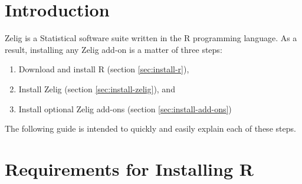 \tableofcontents
\newcommand{\InstallInteractive}[0]{
  \href{http://r.iq.harvard.edu/install_live.R}{http://r.iq.harvard.edu/install_live.R}
}

\newcommand{\CranMirror}[0]{
  \href{http://cran.opensourceresources.org/}{http://cran.opensourceresources.org/}
}

\newcommand{\InstallInstructionsHref}[0]{
  \href{http://cran.r-project.org/doc/manuals/R-admin.html}{http://cran.r-project.org/doc/manuals/R-admin.html}
}


\newcommand{\MacInstallHref}[0]{
\href{http://cran.r-project.org/doc/manuals/R-admin.html\#Installing-R-under-_0028Mac_0029-OS-X}{Mac}
}

\newcommand{\WindowsInstallHref}[0]{
\href{http://cran.r-project.org/doc/manuals/R-admin.html\#Installing-R-under-Windows}{Windows}
}

\newcommand{\UnixInstallHref}[0]{
\href{http://cran.r-project.org/doc/manuals/R-admin.html\#Installing-R-under-Unix_002dalikes}{Unix-alike}
}


\section{Introduction}

Zelig is a Statistical software suite written in the R programming language.
As a result, installing any Zelig add-on is a matter of three steps:

\begin{enumerate}
  \item Download and install R (section \ref{sec:install-r}),
  \item Install Zelig (section \ref{sec:install-zelig}), and
  \item Install optional Zelig add-ons (section \ref{sec:install-add-ons})
\end{enumerate}

The following guide is intended to quickly and easily explain each of these steps.


%
%
\section{Requirements for Installing R}


